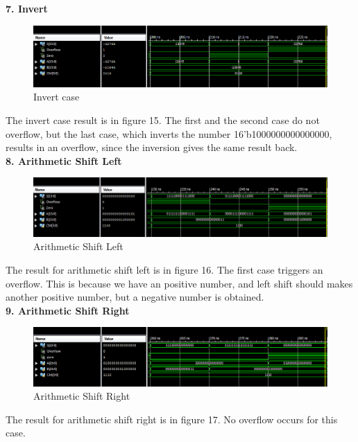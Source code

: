 \documentclass{article}
\begin{document}
\textbf{7. Invert}\\
\begin{figure}[!htb]
  \centering
  \includegraphics[width=\linewidth]{0110.PNG}
  \caption{Invert case}
  \label{fig:invert}
\end{figure}
The invert case result is in figure 15. The first and the second case do not overflow, but the last case, which inverts the number 16'b1000000000000000, results in an overflow, since the inversion gives the same result back.\\

\textbf{8. Arithmetic Shift Left}\\
\begin{figure}[!htb]
  \centering
  \includegraphics[width=\linewidth]{1100.PNG}
  \caption{Arithmetic Shift Left}
  \label{fig:arith left}
\end{figure}
The result for arithmetic shift left is in figure 16. The first case triggers an overflow. This is because we have an positive number, and left shift should makes another positive number, but a negative number is obtained. \\

\textbf{9. Arithmetic Shift Right}\\
\begin{figure}[!htb]
  \centering
  \includegraphics[width=\linewidth]{1110.PNG}
  \caption{Arithmetic Shift Right}
  \label{fig:arith right}
\end{figure}
The result for arithmetic shift right is in figure 17. No overflow occurs for this case. \\
\end{document}
